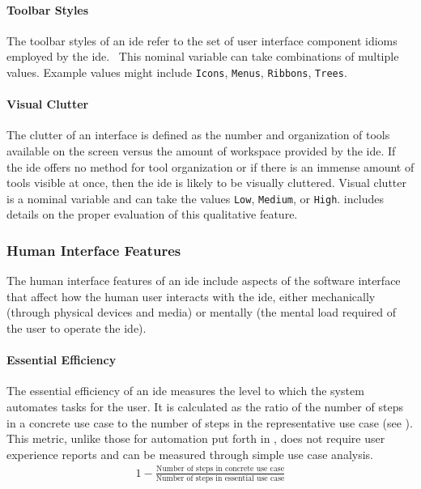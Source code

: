 \paragraph{Toolbar Styles} The toolbar styles of an \ac{ide} refer to the set of
user interface component idioms employed by the \ac{ide}.~\cite{galitz2007} This
nominal variable can take combinations of multiple values. Example values
might include \texttt{Icons}, \texttt{Menus}, \texttt{Ribbons},
\texttt{Trees}.


\paragraph{Visual Clutter} The clutter of an interface is defined as the
number and organization of tools available on the screen versus the amount
of workspace provided by the \ac{ide}. If the \ac{ide} offers no method for tool
organization or if there is an immense amount of tools visible at once,
then the \ac{ide} is likely to be visually cluttered. Visual clutter is a
nominal variable and can take the values \texttt{Low}, \texttt{Medium}, or
\texttt{High}.  includes details on the proper
evaluation of this qualitative feature.


\subsubsection{Human Interface Features} \label{subsubsec:humaninterface}

The human interface features of an \ac{ide} include aspects of the software
interface that affect how the human user interacts with the \ac{ide}, either
mechanically (\eg through physical devices and media) or mentally (\eg the
mental load required of the user to operate the \ac{ide}).


\paragraph{Essential Efficiency} The essential efficiency of an \ac{ide}
measures the level to which the system automates tasks for the user. It is
calculated as the ratio of the number of steps in a concrete use case to
the number of steps in the representative use case (see
). This metric, unlike those for automation put forth in
\cite{wei1998}, does not require user experience reports and can be
measured through simple use case analysis.
%
\begin{align}\label{eq:eefficiency}
  1 - \frac{\text{Number of steps in concrete use case}}
            {\text{Number of steps in essential use case}}
\end{align}


